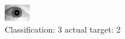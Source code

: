 \begin{figure}[h!]
\begin{center}
\includegraphics[width=0.60\columnwidth]{figures/ID1775_class_3_target_2.png}
\end{center}
\caption{ Classification: 3 actual target: 2}
\label{fig:ID1775_class_3_target_2}
\end{figure}
